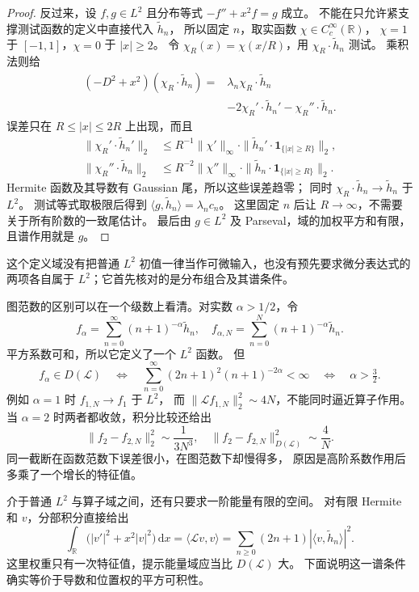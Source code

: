 \begin{proof}
反过来，设 \(f,g\in L^2\) 且分布等式 \(-f''+x^2f=g\) 成立。
不能在只允许紧支撑测试函数的定义中直接代入 \(\widetilde h_n\)，
所以固定 \(n\)，取实函数 \(\chi\in C_c^\infty(\mathbb R)\)，
\(\chi=1\) 于 \([-1,1]\)，\(\chi=0\) 于 \(|x|\geq2\)。
令 \(\chi_R(x)=\chi(x/R)\)，用 \(\chi_R\cdot\widetilde h_n\) 测试。
乘积法则给
\[
 \begin{aligned}
 (-D^2+x^2)(\chi_R\cdot\widetilde h_n)
 ={}&\lambda_n\chi_R\cdot\widetilde h_n\\
 &-2\chi_R'\cdot\widetilde h_n'
 -\chi_R''\cdot\widetilde h_n.
 \end{aligned}
\]
误差只在 \(R\leq|x|\leq2R\) 上出现，而且
\[
 \begin{aligned}
 \|\chi_R'\cdot\widetilde h_n'\|_2
 &\leq R^{-1}\|\chi'\|_\infty
 \cdot\|\widetilde h_n'\cdot\mathbf1_{\{|x|\geq R\}}\|_2,\\
 \|\chi_R''\cdot\widetilde h_n\|_2
 &\leq R^{-2}\|\chi''\|_\infty
 \cdot\|\widetilde h_n\cdot\mathbf1_{\{|x|\geq R\}}\|_2.
 \end{aligned}
\]
Hermite 函数及其导数有 Gaussian 尾，所以这些误差趋零；
同时 \(\chi_R\cdot\widetilde h_n\to\widetilde h_n\) 于 \(L^2\)。
测试等式取极限后得到
\(\langle g,\widetilde h_n\rangle=\lambda_nc_n\)。
这里固定 \(n\) 后让 \(R\to\infty\)，不需要关于所有阶数的一致尾估计。
最后由 \(g\in L^2\) 及 Parseval，域的加权平方和有限，且谱作用就是 \(g\)。
\end{proof}
这个定义域没有把普通 \(L^2\) 初值一律当作可微输入，也没有预先要求微分表达式的两项各自属于 \(L^2\)；它首先核对的是分布组合及其谱条件。

\ProseParagraphBreak
图范数的区别可以在一个级数上看清。对实数 \(\alpha>1/2\)，令
\[
 f_\alpha=\sum_{n=0}^\infty(n+1)^{-\alpha}\widetilde h_n,
 \quad
 f_{\alpha,N}=\sum_{n=0}^N(n+1)^{-\alpha}\widetilde h_n.
\]
平方系数可和，所以它定义了一个 \(L^2\) 函数。
但
\[
 f_\alpha\in D(\mathcal L)
 \quad\Longleftrightarrow\quad
 \sum_{n=0}^\infty(2n+1)^2(n+1)^{-2\alpha}<\infty
 \quad\Longleftrightarrow\quad \alpha>\tfrac32.
\]
例如 \(\alpha=1\) 时 \(f_{1,N}\to f_1\) 于 \(L^2\)，
而 \(\|\mathcal Lf_{1,N}\|_2^2\sim4N\)，不能同时逼近算子作用。
当 \(\alpha=2\) 时两者都收敛，积分比较还给出
\[
 \|f_2-f_{2,N}\|_2^2\sim\frac1{3N^3},\quad
 \|f_2-f_{2,N}\|_{D(\mathcal L)}^2\sim\frac4N.
\]
同一截断在函数范数下误差很小，在图范数下却慢得多，
原因是高阶系数作用后多乘了一个增长的特征值。

\ProseParagraphBreak
介于普通 \(L^2\) 与算子域之间，还有只要求一阶能量有限的空间。
对有限 Hermite 和 \(v\)，分部积分直接给出
\[
 \int_{\mathbb R}\bigl(|v'|^2+x^2|v|^2\bigr)\,\mathrm dx
 =\langle\mathcal Lv,v\rangle
 =\sum_{n\geq0}(2n+1)|\langle v,\widetilde h_n\rangle|^2.
\]
这里权重只有一次特征值，提示能量域应当比 \(D(\mathcal L)\) 大。
下面说明这一谱条件确实等价于导数和位置权的平方可积性。

